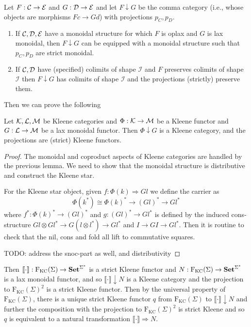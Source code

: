 \documentclass[acmsmall,anonymous,review,screen]{acmart}
\newcommand{\cat}[1]{
  \relax
  \StrLen{#1}[\arglength]
  \ifnum\arglength=1
  \mathcal{#1}
  \else
  \mathbf{#1}
  \fi
}
\newcommand{\FKC}{\textrm{F}_{\textrm{KC}}}
\newcommand{\sem}[1]{\llbracket{#1}\rrbracket}
\newcommand{\Set}{\cat{Set}}
\begin{document}
\begin{lemma}
  Let $F : \cat C \to \cat E$ and $G : \cat D \to \cat E$ and let $F
  \downarrow G$ be the comma category (i.e., whose objects are
  morphisms $F c \to G d$) with projections $p_C,p_D$.
  \begin{enumerate}
  \item If $\cat C, \cat D, \cat E$ have a monoidal structure for
    which $F$ is oplax and $G$ is lax monoidal, then $F \downarrow G$
    can be equipped with a monoidal structure such that $p_C,p_D$ are
    strict monoidal.
  \item If $\cat C, \cat D$ have (specified) colimits of shape
    $\mathcal I$ and $F$ preserves colimits of shape $\mathcal I$ then
    $F \downarrow G$ has colimits of shape $\mathcal I$ and the
    projections (strictly) preserve them.
  \end{enumerate}
\end{lemma}

Then we can prove the following
\begin{theorem}
  Let $\cat K, \cat L, \cat M$ be Kleene categories and $\Phi : \cat K
  \to \cat M$ be a Kleene functor and $G : \cat L \to \cat M$ be a lax
  monoidal functor. Then $\Phi \downarrow G$ is a Kleene category, and
  the projections are (strict) Kleene functors.
\end{theorem}
\begin{proof}
  The monoidal and coproduct aspects of Kleene categories are handled
  by the previous lemma. We need to show that the monoidal structure
  is distributive and construct the Kleene star.

  For the Kleene star object, given $f :
  \Phi(k) \Rightarrow G l$ we define the carrier as
  \[ \Phi(k^*) \cong \Phi(k)^* \to (G l)^* \to G l^* \]
  where $f^* : \Phi(k)^* \to (G l)^*$ and $g : (G l)^* \to G l^*$ is
  defined by the induced cons-structure $G l \otimes G l^* \to G (l
  \otimes l^*) \to G l^*$ and $I \to G I \to G l^*$. Then it is
  routine to check that the nil, cons and fold all lift to commutative
  squares.

  TODO: address the snoc-part as well, and distributivity
\end{proof}

Then $\sem {\cdot} : \FKC(\Sigma) \to \Set^{\Sigma^*}$ is a strict
Kleene functor and $N : \FKC(\Sigma) \to \Set^{\Sigma^*}$ is a lax
monoidal functor, and so $\sem{\cdot}\downarrow N$ is a Kleene
category and the projection to $\FKC(\Sigma)^2$ is a strict Kleene
functor. Then by the universal property of $\FKC(\Sigma)$, there is a
unique strict Kleene functor $q$ from $\FKC(\Sigma)$ to
$\sem{\cdot}\downarrow N$ and further the composition with the
projection to $\FKC(\Sigma)^2$ is strict Kleene and so $q$ is
equivalent to a natural transformation $\sem{\cdot} \Rightarrow N$.
\end{document}
